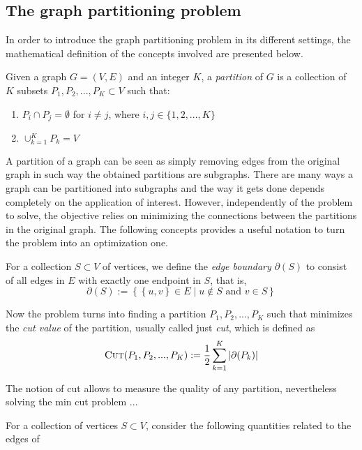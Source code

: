\subsection{The graph partitioning problem}
In order to introduce the graph partitioning problem in its different settings, the mathematical definition of the concepts involved are presented below.
\begin{definition}
	Given a graph $G = (V, E)$ and an integer $K$, a \textit{partition} of $G$ is a collection of $K$ subsets $P_1, P_2, ..., P_K\subset V$ such that:
	\begin{enumerate}
		\item $P_i \cap P_j = \emptyset$ for $i\neq j$, where $i,j\in \{1,2,...,K\}$
		\item $\cup_{k=1}^K P_k = V$
	\end{enumerate}	 
\end{definition}
    A partition of a graph can be seen as simply removing edges from the original graph in such way the obtained partitions are subgraphs. There are many ways a graph can be partitioned into subgraphs and the way it gets done depends completely on the application of interest. However, independently of the problem to solve, the objective relies on minimizing the connections between the partitions in the original graph. The following concepts provides a useful notation to turn the problem into an optimization one.
    
	For a collection $S\subset V$ of vertices, we define the \textit{edge boundary} $\partial(S)$ to consist of all edges in $E$ with exactly one endpoint in $S$, that is,
	\begin{displaymath}
		\partial(S) := \left\{ \left\{u, v\right\}  \in E \mid u \notin S \text{ and } v\in S \right\}
	\end{displaymath}
	
	Now the problem turns into finding a partition $P_1, P_2, ..., P_K$ such that minimizes the \textit{cut value} of the partition, usually called just \textit{cut}, which is defined as
	\begin{equation}
	    \label{mincut}
	    \textsc{Cut}(P_1, P_2, ..., P_K) := \frac{1}{2} \sum_{k=1}^K \left|\partial(P_k)\right|
	\end{equation}
	
	The notion of cut allows to measure the quality of any partition, nevertheless solving the min cut problem ...

	For a collection of vertices $S\subset V$, consider the following quantities related to the edges of 
	
